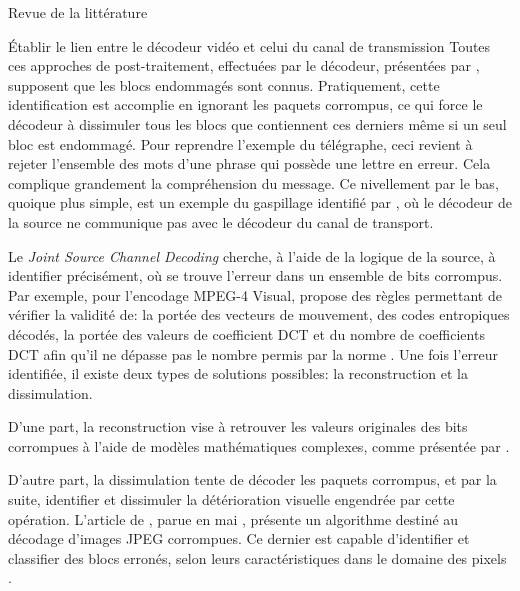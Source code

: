 \documentclass[letterpaper, twoside, 12pt,memoire]{thETS}
\begin{document}
\begin{chapter}{Revue de la littérature}
\begin{section}{Établir le lien entre le décodeur vidéo et celui du canal de
transmission}
Toutes ces approches de post-traitement, effectuées par le décodeur, présentées
par \citet{Wang1998}, supposent que les blocs endommagés sont connus.
Pratiquement, cette identification est accomplie en ignorant les paquets
corrompus, ce qui force le décodeur à dissimuler tous les blocs que contiennent
ces derniers même si un seul bloc est endommagé. Pour reprendre l'exemple du télégraphe, ceci revient à rejeter
l'ensemble des mots d'une phrase qui possède une lettre en erreur. Cela complique
grandement la compréhension du message. Ce nivellement par le bas, quoique plus
simple, est un exemple du gaspillage identifié par \citeauthor{Modestino1979},
où le décodeur de la source ne communique pas avec le décodeur du canal de
transport.

Le \textit{Joint Source Channel Decoding} \citep{Duhamel2010} cherche, à l'aide
de la logique de la source, à identifier précisément, où se trouve l'erreur dans
un ensemble de bits corrompus. Par exemple, pour l'encodage MPEG-4 Visual,
\citeauthor{Talluri1998} propose des règles permettant de vérifier la validité
de: la portée des vecteurs de mouvement, des codes entropiques décodés, la
portée des valeurs de coefficient DCT et du nombre de coefficients DCT afin
qu'il ne dépasse pas le nombre permis par la norme \citep{Talluri1998}. Une fois
l'erreur identifiée, il existe deux types de solutions possibles: la reconstruction et la dissimulation.

D'une part, la reconstruction vise à retrouver les valeurs originales des bits
corrompues à l'aide de modèles mathématiques complexes, comme présentée par
\citet{Duhamel2010}.

D'autre part, la dissimulation tente de décoder les paquets corrompus, et par la
suite, identifier et dissimuler la détérioration visuelle engendrée par cette
opération. L'article de \citeauthor{Ye2003}, parue en mai \citeyear{Ye2003},
présente un algorithme destiné au décodage d'images JPEG corrompues. Ce dernier
est capable d'identifier et classifier des blocs erronés, selon leurs
caractéristiques dans le domaine des pixels \citep{Ye2003}.


\end{section}
\end{chapter}
\end{document}
